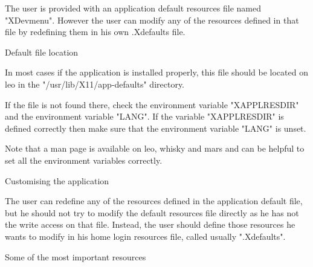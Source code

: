 %
%
%
%
%
%
%
%
%
%
The user is provided with an application default resources file named
"XDevmenu". However the user can modify any of the resources defined in that
file by redefining them in his own .Xdefaults file.

	{Default file location}

In most cases if the application is installed properly, this file
should be located on leo in the "/usr/lib/X11/app-defaults" directory.

If the file is not found there, check the environment variable "XAPPLRESDIR"
and the environment variable "LANG". If the variable "XAPPLRESDIR" is defined
correctly then make sure that the environment variable "LANG" is unset.

Note that a man page is available on leo, whisky and mars and can be helpful to set all the environment variables correctly.


	{Customising the application}

The user can redefine any of the resources defined in the application default
file, but he should not try to modify the default resources file directly as
he has not the write access on that file. Instead, the user should define those
resources he wants to modify in his home login resources file, called usually
".Xdefaults".


	{Some of the most important resources}

